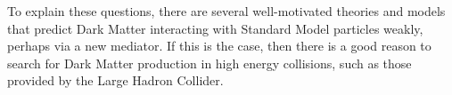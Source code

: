To explain these questions, there are several well-motivated theories and models that predict Dark Matter interacting with Standard Model particles weakly, perhaps via a new mediator. If this is the case, then there is a good reason to search for Dark Matter production in high energy collisions, such as those provided by the Large Hadron Collider.



